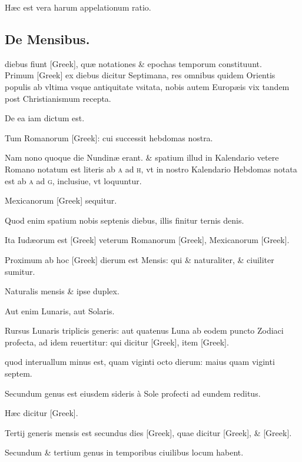 Hæc est vera harum appelationum ratio.



\subsection{De Mensibus.}
\setcounter{parcount}{0}


 diebus fiunt \textgreek{[Greek]}, quæ notationes \& epochas
temporum constituunt.
\\ \p
Primum \textgreek{[Greek]} ex diebus dicitur Septimana,
res omnibus quidem Orientis populis ab vltima vsque
antiquitate vsitata,
 nobis autem Europæis vix tandem post Christianismum
recepta.

De ea iam dictum est.

Tum Romanorum \textgreek{[Greek]}: cui
successit hebdomas nostra.

Nam nono quoque die Nundinæ erant.
\& spatium illud in Kalendario vetere Romano notatum est literis ab
\textsc{a} ad \textsc{h}, vt in nostro Kalendario Hebdomas
 notata est ab \textsc{a} ad \textsc{g}, inclusiue,
vt loquuntur.

Mexicanorum \textgreek{[Greek]} sequitur.

Quod
enim spatium nobis septenis diebus, illis finitur ternis denis.

Ita Iudæorum
est \textgreek{[Greek]} veterum Romanorum \textgreek{[Greek]}, Mexicanorum
\textgreek{[Greek]}.

Proximum ab hoc \textgreek{[Greek]} dierum est Mensis:
qui \& naturaliter, \& ciuiliter sumitur.

Naturalis mensis \& ipse duplex.

Aut enim Lunaris, aut Solaris.

Rursus Lunaris triplicis generis:
aut quatenus Luna ab eodem puncto Zodiaci profecta, ad idem
reuertitur: qui dicitur \textgreek{[Greek]}, item \textgreek{[Greek]}.

quod interuallum
minus est, quam viginti octo dierum: maius quam viginti septem.

Secundum genus est eiusdem sideris à Sole profecti ad eundem
reditus.

Hæc dicitur \textgreek{[Greek]}.

Tertij generis mensis est secundus
dies \textgreek{[Greek]}, quae dicitur \textgreek{[Greek]},
 \& \textgreek{[Greek]}.

Secundum \& tertium genus in temporibus ciuilibus locum habent.

